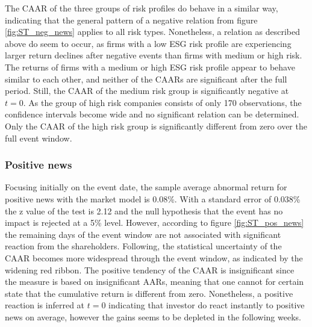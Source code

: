 The CAAR of the three groups of risk profiles do behave in a similar way, indicating that the general pattern of a negative relation from figure \ref{fig:ST_neg_news} applies to all risk types. Nonetheless, a relation as described above do seem to occur, as firms with a low ESG risk profile are experiencing larger return declines after negative events than firms with medium or high risk. The returns of firms with a medium or high ESG risk profile appear to behave similar to each other, and neither of the CAARs are significant after the full period. Still, the CAAR of the medium risk group is significantly negative at $t=0$. As the group of high risk companies consists of only 170 observations, the confidence intervals become wide and no significant relation can be determined. Only the CAAR of the high risk group is significantly different from zero over the full event window.  




\subsubsection{Positive news}

Focusing initially on the event date, the sample average abnormal return for positive news with the market model is 0.08\%. With a standard error of 0.038\% the z value of the test is 2.12 and the null hypothesis that the event has no impact is rejected at a 5\% level. However, according to figure \ref{fig:ST_pos_news} the remaining days of the event window are not associated with significant reaction  from the shareholders. Following, the statistical uncertainty of the CAAR becomes more widespread through the event window, as indicated by the widening red ribbon. The positive tendency of the CAAR is insignificant since the measure is based on insignificant AARs, meaning that one cannot for certain state that the cumulative return is different from zero. Nonetheless, a positive reaction is inferred at $t=0$ indicating that investor do react instantly to positive news on average, however the gains seems to be depleted in the following weeks.  

